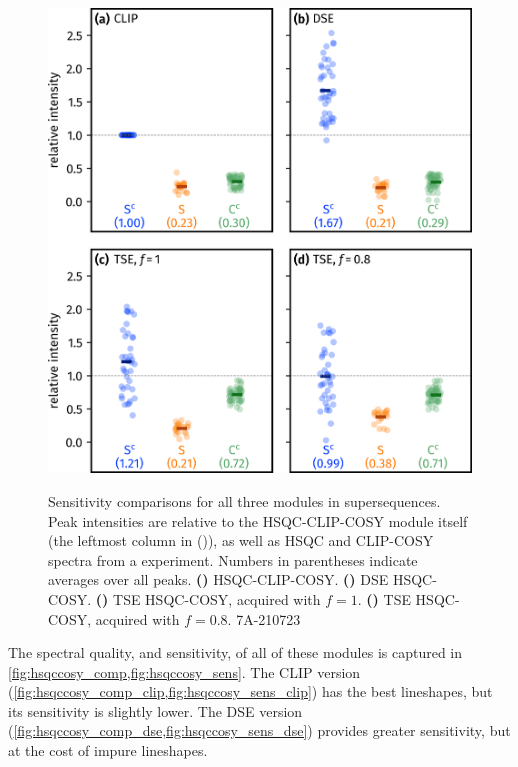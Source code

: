 \documentclass[a4paper,12pt]{article}
\begin{document}
\begin{refsection}
\begin{figure}[!ht]
    \centering
    \includegraphics[]{hsqccosy_sens.png}%
    {\label{fig:hsqccosy_sens_clip}}%
    {\label{fig:hsqccosy_sens_dse}}%
    {\label{fig:hsqccosy_sens_tse_1}}%
    {\label{fig:hsqccosy_sens_tse_0p8}}%
    \caption[Sensitivity comparisons for  supersequences]{
        Sensitivity comparisons for all three modules in  supersequences.
        Peak intensities are relative to the HSQC-CLIP-COSY module itself (the leftmost column in ()), as well as HSQC and CLIP-COSY spectra from a  experiment.
        Numbers in parentheses indicate averages over all peaks.
        \textbf{()} HSQC-CLIP-COSY.
        \textbf{()} DSE HSQC-COSY.
        \textbf{()} TSE HSQC-COSY, acquired with $f = 1$.
        \textbf{()} TSE HSQC-COSY, acquired with $f = 0.8$.
        7A-210723
    }
    \label{fig:hsqccosy_sens}
\end{figure}

The spectral quality, and sensitivity, of all of these modules is captured in \cref{fig:hsqccosy_comp,fig:hsqccosy_sens}.
The CLIP version (\cref{fig:hsqccosy_comp_clip,fig:hsqccosy_sens_clip}) has the best lineshapes, but its sensitivity is slightly lower.
The DSE version (\cref{fig:hsqccosy_comp_dse,fig:hsqccosy_sens_dse}) provides greater sensitivity, but at the cost of impure lineshapes.


\end{refsection}
\end{document}
